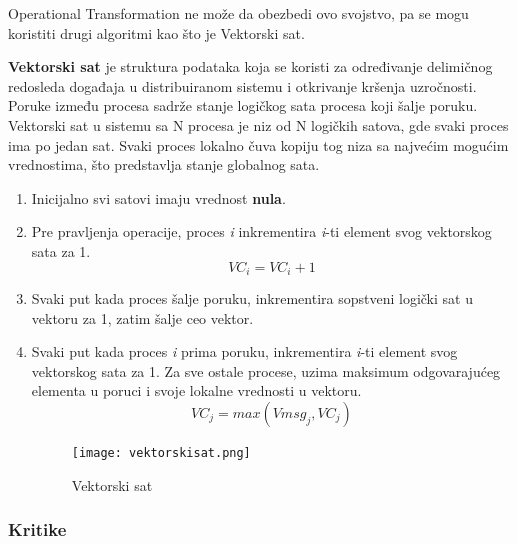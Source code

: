 \documentclass[12pt]{article}
\begin{document}
\begin{itemize}
	      Operational Transformation ne može da obezbedi ovo svojstvo, pa se mogu koristiti drugi algoritmi kao što je Vektorski sat.
	      
	      \textbf{Vektorski sat} je struktura podataka koja se koristi za određivanje delimičnog redosleda događaja u distribuiranom sistemu i otkrivanje kršenja uzročnosti. Poruke između procesa sadrže stanje logičkog sata procesa koji šalje poruku. Vektorski sat u sistemu sa N procesa je niz od N logičkih satova, gde svaki proces ima po jedan sat. Svaki proces lokalno čuva kopiju tog niza sa najvećim mogućim vrednostima, što predstavlja stanje globalnog sata.
	      
	      \begin{enumerate}
	      	\item Inicijalno svi satovi imaju vrednost \textbf{nula}.
	      	\item Pre pravljenja operacije, proces \textit{i} inkrementira \textit{i}-ti element svog vektorskog sata za 1.
	      	      \[ VC_i = VC_i + 1 \]
	      	\item Svaki put kada proces šalje poruku, inkrementira sopstveni logički sat u vektoru za 1, zatim šalje ceo vektor.
	      	\item Svaki put kada proces \textit{i} prima poruku, inkrementira \textit{i}-ti element svog vektorskog sata za 1. Za sve ostale procese, uzima maksimum odgovarajućeg elementa u poruci i svoje lokalne vrednosti u vektoru.
	      	      \[ VC_j = max(Vmsg_j, VC_j)\]
	      	      \begin{figure}[H]
	      	      	\centering
	      	      	\texttt{[image: vektorskisat.png]}
	      	      	\caption{Vektorski sat}
	      	      	\label{fig:nls_demo}
	      	      \end{figure}
	      	                  
	      \end{enumerate}
	      
\end{itemize}

\subsubsection{Kritike}
\end{document}
